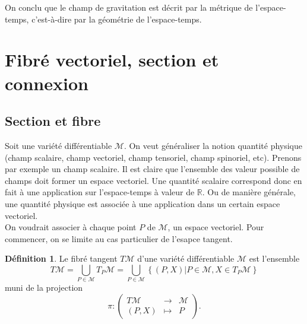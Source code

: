 \documentclass[a4paper,11pt]{report}
\theoremstyle{definition}
\theoremstyle{plain}
\theoremstyle{definition}
\newtheorem{defn}{Définition}[chapter]
\theoremstyle{remark}
\newcommand{\M}{\mathscr{M}}
\begin{document}
                On conclu que le champ de gravitation est décrit par la métrique de l'espace-temps, c'est-à-dire par la géométrie de l'espace-temps.
            
        \section{Fibré vectoriel, section et connexion}
        
            \subsection{Section et fibre}
        
                Soit une variété différentiable $\M$. On veut généraliser la notion quantité physique (champ scalaire, champ vectoriel, champ tensoriel, champ spinoriel, etc). Prenons par exemple un champ scalaire. Il est claire que l'ensemble des valeur possible de champs doit former un espace vectoriel. Une quantité scalaire correspond donc en fait à une application sur l'espace-temps à valeur de $\mathbb{R}$. Ou de manière générale, une quantité physique est associée à une application dans un certain espace vectoriel.\\
                
                On voudrait associer à chaque point $P$ de $\M$, un espace vectoriel. Pour commencer, on se limite au cas particulier de l'esapce tangent.
                
                \begin{defn}
                    Le fibré tangent $T\M$ d'une variété différentiable $\M$ est l'ensemble
                    \begin{equation}
                        T\M = \bigcup_{P\in\M}T_P\M = \bigcup_{P\in\M}\left\{ (P,X)|P\in\M, X\in T_P\M \right\}
                    \end{equation}
                    muni de la projection
                    \begin{equation}
                    \pi:\left(
                    \begin{array}{ccc}
                        T\M & \longrightarrow & \M \\
                        (P,X) & \longmapsto & P
                    \end{array}
                    \right).
                    \end{equation}
                \end{defn}
                
\end{document}

